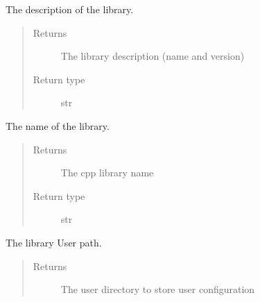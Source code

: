 \documentclass[letterpaper,10pt,english]{sphinxmanual}
\begin{document}
\begin{fulllineitems}
\begin{fulllineitems}
\begin{quote}
\begin{description}
\end{description}\end{quote}

\end{fulllineitems}


\begin{fulllineitems}
\label{controller:openzwave.controller.ZWaveController.library_description}
The description of the library.
\begin{quote}\begin{description}
\item[{Returns}] \leavevmode
The library description (name and version)

\item[{Return type}] \leavevmode
str

\end{description}\end{quote}

\end{fulllineitems}


\begin{fulllineitems}
\label{controller:openzwave.controller.ZWaveController.library_type_name}
The name of the library.
\begin{quote}\begin{description}
\item[{Returns}] \leavevmode
The cpp library name

\item[{Return type}] \leavevmode
str

\end{description}\end{quote}

\end{fulllineitems}


\begin{fulllineitems}
\label{controller:openzwave.controller.ZWaveController.library_user_path}
The library User path.
\begin{quote}\begin{description}
\item[{Returns}] \leavevmode
The user directory to store user configuration


\end{description}
\end{quote}
\end{fulllineitems}
\end{fulllineitems}
\end{document}
